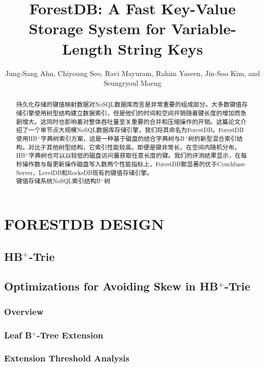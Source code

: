 \documentclass[lang=cn]{cls/elegantpaper}
\title{ForestDB: A Fast Key-Value Storage System for Variable-Length String Keys}
\author{Jung-Sang Ahn, Chiyoung Seo, Ravi Mayuram, Rahim Yaseen, Jin-Soo Kim, and Seungryoul Maeng}
\begin{document}
\maketitle

\begin{abstract}
\noindent \sffamily 持久化存储的键值映射数据对NoSQL数据库而言是非常重要的组成部分。大多数键值存储引擎使用树型结构建立数据索引，但是他们的时间和空间开销随着键长度的增加而急剧增大。这同时也影响着对整体吞吐量至关重要的合并和压缩操作的开销。这篇论文介绍了一个单节点大规模NoSQL数据库存储引擎，我们将其命名为ForestDB。ForestDB使用HB$^+$字典树索引方案，这是一种基于磁盘的结合字典树与B$^+$树的新型混合索引结构。对比于其他树型结构，它索引性能较高。即便是键非常长，在空间内随机分布，HB$^+$字典树也可以以较低的磁盘访问量获取任意长度的键。我们的评测结果显示，在每秒操作数与每更新操作磁盘写入数两个性能指标上，ForestDB都显著的优于Couchbase Server、LevelDB和RocksDB现有的键值存储引擎。\\

\noindent {} 键值存储系统\quad NoSQL\quad 索引结构\quad B$^+$树
\end{abstract}


\section{FORESTDB DESIGN}

\subsection{HB$^+$-Trie}

\subsection{Optimizations for Avoiding Skew in HB$^+$-Trie}

\subsubsection{Overview}

\subsubsection{Leaf B$^+$-Tree Extension}

\subsubsection{Extension Threshold Analysis}
\end{document}
